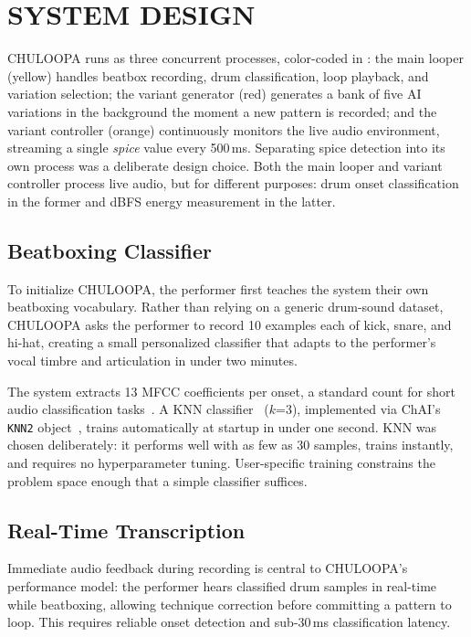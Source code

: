 \documentclass{aimc2026}
\begin{document}
\section{SYSTEM DESIGN}
\label{sec:system}

CHULOOPA runs as three concurrent processes, color-coded in : the main looper (yellow) handles beatbox recording, drum classification, loop playback, and variation selection; the variant generator (red) generates a bank of five AI variations in the background the moment a new pattern is recorded; and the variant controller (orange) continuously monitors the live audio environment, streaming a single \emph{spice} value every 500\,ms. Separating spice detection into its own process was a deliberate design choice. Both the main looper and variant controller process live audio, but for different purposes: drum onset classification in the former and dBFS energy measurement in the latter.

\subsection{Beatboxing Classifier}

To initialize CHULOOPA, the performer first teaches the system their own beatboxing vocabulary. Rather than relying on a generic drum-sound dataset, CHULOOPA asks the performer to record 10 examples each of kick, snare, and hi-hat, creating a small personalized classifier that adapts to the performer’s vocal timbre and articulation in under two minutes.

The system extracts 13 MFCC coefficients per onset, a standard count for short audio classification tasks~\citep{martanto2025beatbox}. A KNN classifier~\citep{cover1967nearest} ($k$=3), implemented via ChAI's \texttt{KNN2} object~\citep{li2024chai}, trains automatically at startup in under one second. KNN was chosen deliberately: it performs well with as few as 30 samples, trains instantly, and requires no hyperparameter tuning. User-specific training constrains the problem space enough that a simple classifier suffices.

\subsection{Real-Time Transcription}

Immediate audio feedback during recording is central to CHULOOPA's performance model: the performer hears classified drum samples in real-time while beatboxing, allowing technique correction before committing a pattern to loop. This requires reliable onset detection and sub-30\,ms classification latency.
\end{document}
